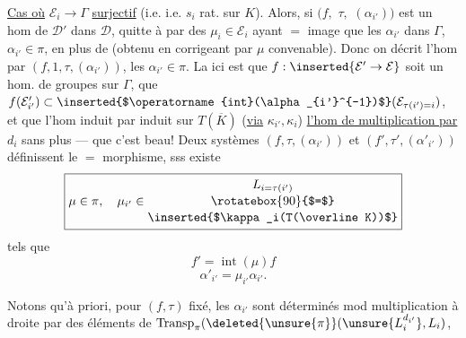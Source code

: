 

\uline{Cas où}  $\mathcal E_i\to\Gamma$  \uline{surjectif} (i.e.   i.e. $s_i$ rat. sur $K$).
Alors, si $(f,$ \deleted{\unsure{$\alpha$,}} $\tau,$  $(\alpha_{i'}))$ est un hom de $\mathcal D'$ dans $\mathcal D$,  quitte à   par des $\mu_i\in\mathcal E_i$ ayant $=$ image que les $\alpha_{i'}$ dans $\Gamma$,  $\alpha_{i'}\in\pi$, en plus de  (obtenu en corrigeant par $\mu$ convenable).
Donc on décrit l'hom  par $(f,1,\tau,(\alpha_{i'}))$, les $\alpha_{i'}\in\pi$. La    ici est que $f:\inserted{\mathcal E'\to\mathcal E}$ soit un hom. de groupes sur $\Gamma$, que  $f(\mathcal E'_{i'})\subset\text{\inserted{$\operatorname{int}(\alpha_{i'}^{-1})$}}(\mathcal E_{\tau(i')=i})$, et que l'hom induit  par    induit sur $T(\overline K)$ (\uline{via} $\kappa_{i'},\kappa_i$) \uline{l'hom de multiplication par $d_i$} sans plus --- que c'est beau!
Deux systèmes $(f,\tau,(\alpha_{i'}))$ et $(f',\tau',(\alpha'_{i'}))$ définissent le $=$ morphisme, sss  existe
\[
 \boxed{\mu\in\pi,\quad\mu_{i'}\in\begin{gathered}L_{i=\tau(i')}\\[-2pt]\rotatebox{90}{$=$}\\[-2pt]\text{\inserted{$\kappa_i(T(\overline K))$}}\end{gathered}}
\]
tels que
\[
 f'=\operatorname{int}(\mu)f
\]
\[
 \alpha'_{i'}=\mu_{i'}\alpha_{i'}.
\]

 Notons qu'à priori, pour $(f,\tau)$ fixé, les $\alpha_{i'}$ sont déterminés mod multiplication à droite par des éléments de $\operatorname{Transp}_{\pi}(\deleted{\unsure{\pi}}(\unsure{L_i^{d_{i'}}},L_i)$,

